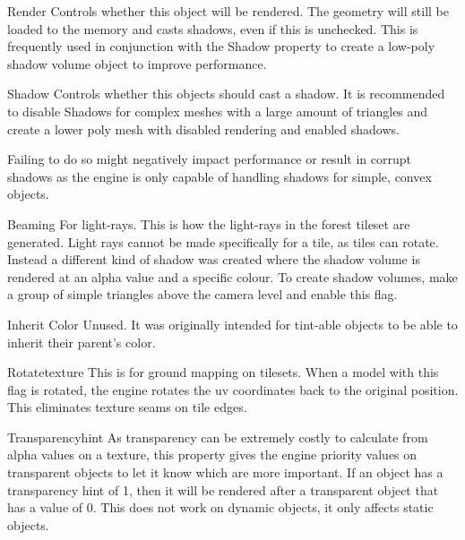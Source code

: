 \begin{propertyAurora}{Render}
Controls whether this object will be rendered. The geometry will still be loaded to the memory and 
casts shadows, even if this is unchecked. This is frequently used in conjunction with the Shadow
property to create a low-poly shadow volume object to improve performance.
\end{propertyAurora}

\begin{propertyAurora}{Shadow}
Controls whether this objects should cast a shadow. It is recommended to 
disable Shadows for complex meshes with a large amount of triangles and create 
a lower poly mesh with disabled rendering and enabled shadows.

Failing to do so might negatively impact performance or result in corrupt shadows as 
the engine is only capable of handling shadows for simple, convex objects.
\end{propertyAurora}

\begin{propertyAurora}{Beaming}
For light-rays. This is how the light-rays in the forest tileset are generated. 
Light rays cannot be made specifically for a tile, as tiles can rotate.
Instead a different kind of shadow was created where the shadow
volume is rendered at an alpha value and a specific colour. To create shadow
volumes, make a group of simple triangles above the camera level and enable
this flag.
\end{propertyAurora}

\begin{propertyAurora}{Inherit Color}
Unused. It was originally intended for tint-able objects to be 
able to inherit their parent's color.
\end{propertyAurora}

\begin{propertyAurora}{Rotatetexture}
This is for ground mapping on tilesets. When a model with
this flag is rotated, the engine rotates the uv coordinates back 
to the original position. This eliminates texture seams on tile edges.
\end{propertyAurora}

\begin{propertyAurora}{Transparencyhint}
As transparency can be extremely costly to calculate from alpha values on a
texture, this property gives the engine priority values on transparent objects to let it
know which are more important. If an object has a transparency hint of 1, then it
will be rendered after a transparent object that has a value of 0. This does not work 
on dynamic objects, it only affects static objects.
\end{propertyAurora}

